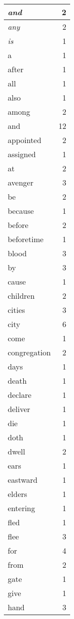 \begin{center}
\begin{longtable}{l|r}
\emph{and} & 2\\ \hline 
\emph{any} & 2\\ \hline 
\emph{is} & 1\\ \hline 
a & 1\\ \hline 
after & 1\\ \hline 
all & 1\\ \hline 
also & 1\\ \hline 
among & 2\\ \hline 
and & 12\\ \hline 
appointed & 2\\ \hline 
assigned & 1\\ \hline 
at & 2\\ \hline 
avenger & 3\\ \hline 
be & 2\\ \hline 
because & 1\\ \hline 
before & 2\\ \hline 
beforetime & 1\\ \hline 
blood & 3\\ \hline 
by & 3\\ \hline 
cause & 1\\ \hline 
children & 2\\ \hline 
cities & 3\\ \hline 
city & 6\\ \hline 
come & 1\\ \hline 
congregation & 2\\ \hline 
days & 1\\ \hline 
death & 1\\ \hline 
declare & 1\\ \hline 
deliver & 1\\ \hline 
die & 1\\ \hline 
doth & 1\\ \hline 
dwell & 2\\ \hline 
ears & 1\\ \hline 
eastward & 1\\ \hline 
elders & 1\\ \hline 
entering & 1\\ \hline 
fled & 1\\ \hline 
flee & 3\\ \hline 
for & 4\\ \hline 
from & 2\\ \hline 
gate & 1\\ \hline 
give & 1\\ \hline 
hand & 3\\ \hline 

\end{longtable}
\end{center}
